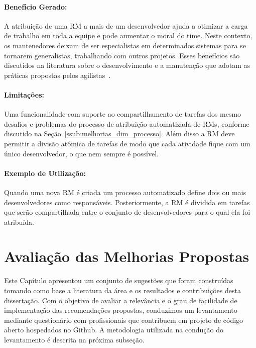 \paragraph{Benefício Gerado:}
\label{par:papéis_afetados_s08}

A atribuição de uma RM a mais de um desenvolvedor ajuda a otimizar a carga de
trabalho em toda a equipe e pode aumentar o moral do time. Neste contexto, os
mantenedores deixam de ser especialistas em determinados sistemas para se
tornarem generalistas, trabalhando com outros projetos. Esses benefícios são
discutidos na literatura sobre o desenvolvimento e a manutenção que adotam as
práticas propostas pelos agilistas~\cite{dybaa2008empirical,rudzki2009agile}.

\paragraph{Limitações:}
\label{par:limitacoes_s08}

Uma funcionalidade com suporte ao compartilhamento de tarefas dos mesmo desafios
e problemas do processo de atribuição automatizada de RMs, conforme discutido na
Seção~\ref{ssub:melhorias_dim_processo}. Além disso a RM deve permitir a divisão
atômica de tarefas de modo que cada atividade fique com um único desenvolvedor,
o que nem sempre é possível.

\paragraph{Exemplo de Utilização:}
\label{par:exemplo_de_utilização_s08}

Quando uma nova RM é criada um processo automatizado define dois ou mais
desenvolvedores como responsáveis. Posteriormente, a RM é dividida em tarefas
que serão compartilhada entre o conjunto de desenvolvedores para o qual ela foi
atribuída.

\section{Avaliação das Melhorias Propostas}
\label{sec:sug_melhoria_avaliacao_das_melhorias}

Este Capítulo apresentou um conjunto de sugestões que foram construídas tomando
como base a literatura da área e os resultados e contribuições desta
dissertação. Com o objetivo de avaliar a relevância e o grau de facilidade de
implementação das recomendações propostas, conduzimos um levantamento mediante
questionário com profissionais que contribuem em projeto de código aberto
hospedados no Github. A metodologia utilizada na condução do levantamento é
descrita na próxima subseção.


